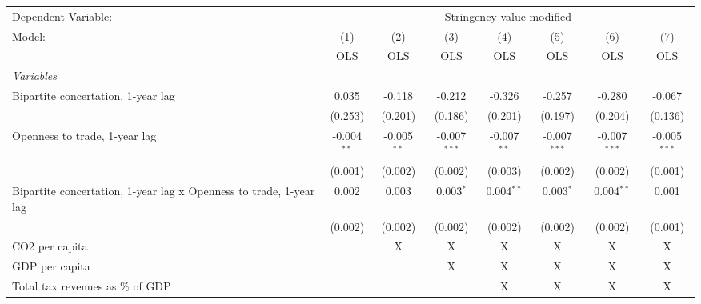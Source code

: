 
\begingroup
\centering
\begin{tabular}{lccccccc}
   \toprule
   Dependent Variable: & \multicolumn{7}{c}{Stringency value modified}\\
   Model:                                                             & (1)           & (2)           & (3)            & (4)           & (5)            & (6)            & (7)\\  
                                                                      &  OLS          & OLS           & OLS            & OLS           & OLS            & OLS            & OLS\\  
   \midrule
   \emph{Variables}\\
   Bipartite concertation, 1-year lag                                 & 0.035         & -0.118        & -0.212         & -0.326        & -0.257         & -0.280         & -0.067\\   
                                                                      & (0.253)       & (0.201)       & (0.186)        & (0.201)       & (0.197)        & (0.204)        & (0.136)\\   
   Openness to trade, 1-year lag                                      & -0.004$^{**}$ & -0.005$^{**}$ & -0.007$^{***}$ & -0.007$^{**}$ & -0.007$^{***}$ & -0.007$^{***}$ & -0.005$^{***}$\\   
                                                                      & (0.001)       & (0.002)       & (0.002)        & (0.003)       & (0.002)        & (0.002)        & (0.001)\\   
   Bipartite concertation, 1-year lag x Openness to trade, 1-year lag & 0.002         & 0.003         & 0.003$^{*}$    & 0.004$^{**}$  & 0.003$^{*}$    & 0.004$^{**}$   & 0.001\\   
                                                                      & (0.002)       & (0.002)       & (0.002)        & (0.002)       & (0.002)        & (0.002)        & (0.001)\\   
   CO2 per capita                                                     &               & X             & X              & X             & X              & X              & X\\  
   GDP per capita                                                     &               &               & X              & X             & X              & X              & X\\  
   Total tax revenues as \% of GDP                                    &               &               &                & X             & X              & X              & X\\  

\end{tabular}
